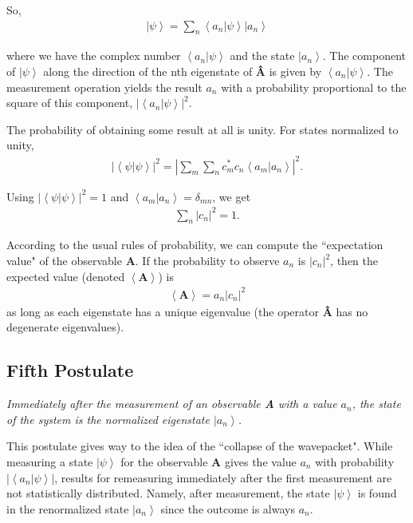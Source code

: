 \documentclass[11pt]{article} %
\newcommand{\ket}[1]{\left|#1\right\rangle}
\newcommand{\braket}[2]{\left\langle#1 |  #2\right\rangle}
\begin{document}
So,
\begin{align}
    \ket{\psi} = \sum_n\braket{a_n}{\psi}\ket{a_n}
\end{align}

where we have the complex number $\braket{a_n}{\psi}$ and the state $\ket{a_n}$. The component of $\ket{\psi}$ along the direction of the nth eigenstate of \textbf{\^A} is given by $\braket{a_n}{\psi}$. The measurement operation yields the result $a_n$ with a probability proportional to the square of this component, $\left|\braket{a_n}{\psi}\right|^2$.

The probability of obtaining some result at all is unity. For states normalized to unity,
\begin{align}
    \left|\braket{\psi}{\psi}\right|^2 = \left|\sum_m\sum_nc_m^\ast c_n\braket{a_m}{a_n}\right|^2.
\end{align}

Using $\left|\braket{\psi}{\psi}\right|^2 = 1$ and $\braket{a_m}{a_n} = \delta_{mn}$, we get
\begin{align}
    \sum_n\left|c_n\right|^2 = 1.
\end{align}

According to the usual rules of probability, we can compute the ``expectation value" of the observable \textbf{A}. If the probability to observe $a_n$ is $\left|c_n\right|^2$, then the expected value
(denoted $\left<\textbf{A}\right>$) is
\begin{align}
    \left<\textbf{A}\right> = a_n\left|c_n\right|^2
\end{align}
as long as each eigenstate has a unique eigenvalue (the operator \textbf{\^A} has no degenerate eigenvalues).

\subsection{Fifth Postulate}
\begin{center}
    \textit{Immediately after the measurement of an observable \textbf{A} with a value $a_n$, the state of the system is the normalized eigenstate $\ket{a_n}$.}
\end{center}

This postulate gives way to the idea of the ``collapse of the wavepacket". While measuring a state $\ket{\psi}$ for the observable \textbf{A} gives the value $a_n$ with probability $\left|\braket{a_n}{\psi}\right|$, results for remeasuring immediately after the first measurement are not statistically distributed. Namely, after measurement, the state $\ket{\psi}$ is found in the renormalized state $\ket{a_n}$ since the outcome is always $a_n$.
\end{document}
